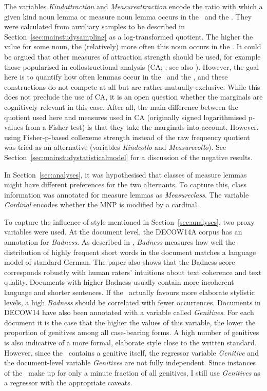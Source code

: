 The variables \textit{Kindattraction} and \textit{Measureattraction} encode the ratio with which a given kind noun lemma or measure noun lemma occurs in the \PGCd\ and the \NACb.
They were calculated from auxiliary samples to be described in Section~\ref{sec:mainstudysampling} as a log-transformed quotient.
The higher the value for some noun, the (relatively) more often this noun occurs in the \PGCd.
It could be argued that other measures of attraction strength should be used, for example those popularised in collostructional analysis (CA; \citealp{StefanowitschGries2003,GriesStefanowitsch2004}; see also \citealp{Gries2015a}).
However, the goal here is to quantify how often lemmas occur in the \PGCd\ and the \NACb, and these constructions do not compete at all but are rather mutually exclusive.
While this does not preclude the use of CA, it is an open question whether the marginals are cognitively relevant in this case.
After all, the main difference between the quotient used here and measures used in CA (originally signed logarithmised p-values from a Fisher test) is that they take the marginals into account. 
However, using Fisher-p-based collexeme strength instead of the raw frequency quotient was tried as an alternative (variables \textit{Kindcollo} and \textit{Measurecollo}).
See Section~\ref{sec:mainstudystatisticalmodel} for a discussion of the negative results.

In Section~\ref{sec:analyses}, it was hypothesised that classes of measure lemmas might have different preferences for the two alternants.
To capture this, class information was annotated for measure lemmas as \textit{Measureclass}.
The variable \textit{Cardinal} encodes whether the MNP is modified by a cardinal.

To capture the influence of style mentioned in Section~\ref{sec:analyses}, two proxy variables were used.
At the document level, the DECOW14A corpus has an annotation for \textit{Badness}.
As described in \cite{SchaeferEa2013}, \textit{Badness} measures how well the distribution of highly frequent short words in the document matches a language model of standard German.
The paper also shows that the Badness score corresponds robustly with human raters' intuitions about text coherence and text quality.
Documents with higher Badness usually contain more incoherent language and shorter sentences.
If the \PGCa\ actually favours more elaborate stylistic levels, a high \textit{Badness} should be correlated with fewer occurrences.
Documents in DECOW14 have also been annotated with a variable called \textit{Genitives}.
For each document it is the case that the higher the values of this variable, the lower the proportion of genitives among all case-bearing forms.
A high number of genitives is also indicative of a more formal, elaborate style close to the written standard.
However, since the \PGCa\ contains a genitive itself, the regressor variable \textit{Genitive} and the document-level variable \textit{Genitives} are not fully independent.
Since instances of the \PGCa\ make up for only a minute fraction of all genitives, I still use \textit{Genitives} as a regressor with the appropriate caveats.

